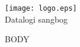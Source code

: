 \documentclass[a4paper,11pt,oneside,openany]{book}
\begin{document}
\begin{center}
  \texttt{[image: logo.eps]}\\
  {\Huge Datalogi sangbog \the\year}
\end{center}
\newpage

\songsection{}
\begin{songs}{}
{{BODY}}
\end{songs}
\end{document}
